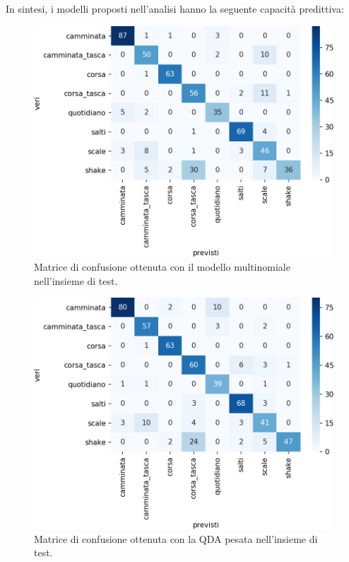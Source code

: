 \documentclass[main.tex]{subfiles}
\begin{document}
In sintesi, i modelli proposti nell'analisi hanno la seguente capacità predittiva:
\begin{figure}[H]
	\centering
	\includegraphics[width=.5\textwidth]{../../figure/confusionMatrix-Mn-test.png}
	\caption{Matrice di confusione ottenuta con il modello multinomiale nell'insieme di test.}
	\label{fig:mn}
\end{figure}

\begin{figure}[H]
	\centering
	\includegraphics[width=.5\textwidth]{../../figure/confusionMatrix-QDA-penalizzata-test.png}
	\caption{Matrice di confusione ottenuta con la QDA pesata nell'insieme di test.}
	\label{fig:mn}
\end{figure}
\end{document}

